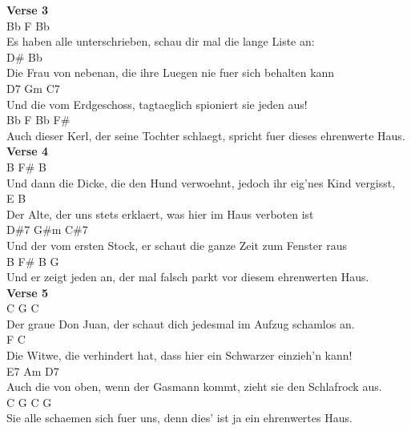 \documentclass[a4paper]{article}
\begin{document}
{{        }
        \textbf{Verse 3}
        ~\\
        {
            \cutive
            \obeyspaces
         Bb                              F                  Bb
\\
Es haben alle unterschrieben, schau dir mal die lange Liste an:
\\
              D\#                                          Bb
\\
Die Frau von nebenan, die ihre Luegen nie fuer sich behalten kann
\\
                                         D7             Gm        C7
\\
Und die vom Erdgeschoss, tagtaeglich spioniert sie jeden aus!
\\
             Bb                         F                                   Bb     F\#
\\
Auch dieser Kerl, der seine Tochter schlaegt, spricht fuer dieses ehrenwerte Haus.
\\

        }
        \textbf{Verse 4}
        ~\\
        {
            \cutive
            \obeyspaces
              B                               F\#                       B
\\
Und dann die Dicke, die den Hund verwoehnt, jedoch ihr eig'nes Kind vergisst,
\\
           E                                               B
\\
Der Alte, der uns stets erklaert, was hier im Haus verboten ist
\\
                                         D\#7                    G\#m      C\#7
\\
Und der vom ersten Stock, er schaut die ganze Zeit zum Fenster raus
\\
              B                        F\#                           B      G
\\
Und er zeigt jeden an, der mal falsch parkt vor diesem ehrenwerten Haus. 
\\

        }
        \textbf{Verse 5}
        ~\\
        {
            \cutive
            \obeyspaces
           C                              G                     C
\\
Der graue Don Juan, der schaut dich jedesmal im Aufzug schamlos an.
\\
            F                                                    C
\\
Die Witwe, die verhindert hat, dass hier ein Schwarzer einzieh'n kann!
\\
                                                  E7                Am       D7
\\
Auch die von oben, wenn der Gasmann kommt, zieht sie den Schlafrock aus.
\\
            C                        G                            C     G
\\
Sie alle schaemen sich fuer uns, denn dies' ist ja ein ehrenwertes Haus.
\\

}}
\end{document}
